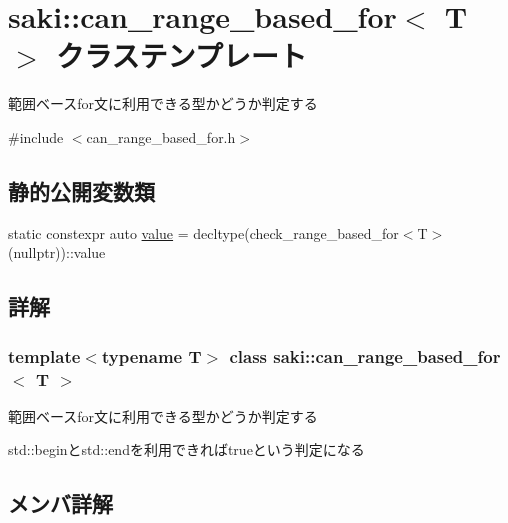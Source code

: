 \hypertarget{classsaki_1_1can__range__based__for}{}\section{saki\+:\+:can\+\_\+range\+\_\+based\+\_\+for$<$ T $>$ クラステンプレート}
\label{classsaki_1_1can__range__based__for}


範囲ベースfor文に利用できる型かどうか判定する  




{\ttfamily \#include $<$can\+\_\+range\+\_\+based\+\_\+for.\+h$>$}

\subsection*{静的公開変数類}
\begin{DoxyCompactItemize}
\item 
static constexpr auto \mbox{\hyperlink{classsaki_1_1can__range__based__for_ad9b48de9333c69be9b613f1ccb6b4f13}{value}} = decltype(check\+\_\+range\+\_\+based\+\_\+for$<$T$>$(nullptr))\+::value
\end{DoxyCompactItemize}


\subsection{詳解}
\subsubsection*{template$<$typename T$>$\newline
class saki\+::can\+\_\+range\+\_\+based\+\_\+for$<$ T $>$}

範囲ベースfor文に利用できる型かどうか判定する 

std\+::beginとstd\+::endを利用できればtrueという判定になる 

\subsection{メンバ詳解}
\mbox{\label{classsaki_1_1can__range__based__for_ad9b48de9333c69be9b613f1ccb6b4f13}} 
